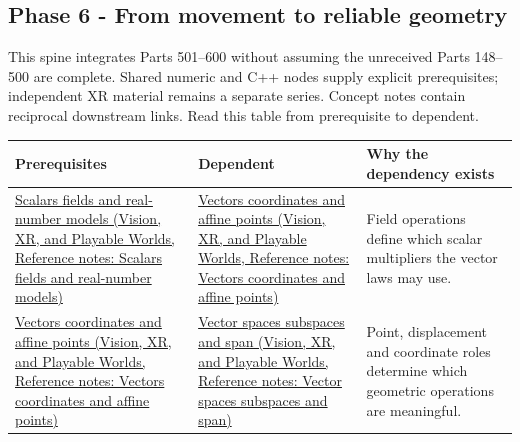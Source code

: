 \subsection{Phase 6 - From movement to reliable geometry}\label{appendix-4ad47bdd269a-phase-6---from-movement-to-reliable-geometry}

This spine integrates Parts 501--600 without assuming the unreceived Parts 148--500 are complete. Shared numeric and C++ nodes supply explicit prerequisites; independent XR material remains a separate series. Concept notes contain reciprocal downstream links. Read this table from prerequisite to dependent.

{\def\LTcaptype{none} %
\begin{longtable}[]{@{}
  >{\raggedright\arraybackslash}p{}
  >{\raggedright\arraybackslash}p{}
  >{\raggedright\arraybackslash}p{}@{}}
\toprule\noalign{}
\begin{minipage}[b]{\linewidth}\raggedright
Prerequisites
\end{minipage} & \begin{minipage}[b]{\linewidth}\raggedright
Dependent
\end{minipage} & \begin{minipage}[b]{\linewidth}\raggedright
Why the dependency exists
\end{minipage} \\
\midrule\noalign{}
\endhead
\bottomrule\noalign{}
\endlastfoot
\href{../07-Vision-XR-and-Playable-Worlds/main.pdf\#nameddest=appendix-52051ad550fe}{Scalars fields and real-number models (Vision, XR, and Playable Worlds, Reference notes: Scalars fields and real-number models)} & \href{../07-Vision-XR-and-Playable-Worlds/main.pdf\#nameddest=appendix-0659864c0aa3}{Vectors coordinates and affine points (Vision, XR, and Playable Worlds, Reference notes: Vectors coordinates and affine points)} & Field operations define which scalar multipliers the vector laws may use. \\
\href{../07-Vision-XR-and-Playable-Worlds/main.pdf\#nameddest=appendix-0659864c0aa3}{Vectors coordinates and affine points (Vision, XR, and Playable Worlds, Reference notes: Vectors coordinates and affine points)} & \href{../07-Vision-XR-and-Playable-Worlds/main.pdf\#nameddest=appendix-173b52c063ae}{Vector spaces subspaces and span (Vision, XR, and Playable Worlds, Reference notes: Vector spaces subspaces and span)} & Point, displacement and coordinate roles determine which geometric operations are meaningful. \\

\end{longtable}}
